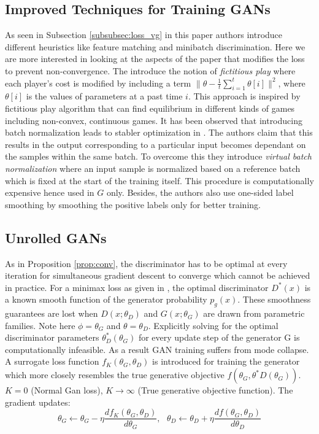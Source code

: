\subsection*{Improved Techniques for Training GANs \citep{goodfellow16}}
As seen in Subsection \ref{subsubsec:loss_vg} in this paper authors introduce different heuristics like feature matching and minibatch discrimination. Here we are more interested in looking at the aspects of the paper that modifies the loss to prevent non-convergence. 
The introduce the notion of \emph{fictitious play} where each player's cost is modified by including a term $\parallel \theta - \frac{1}{t} \sum_{i=1}^{t} \theta[i] \parallel^2$, where $\theta[i]$ is the values of parameters at a past time $i$. This approach is inspired by fictitious play algorithm that can find equilibrium in different kinds of games including non-convex, continuous games. It has been observed that introducing batch normalization leads to stabler optimization in \citep{dcgan}. The authors claim that this results in the output corresponding to a particular input becomes dependant on the samples within the same batch. To overcome this they introduce \emph{virtual batch normalization} where an input sample is normalized based on a reference batch which is fixed at the start of the training itself. This procedure is computationally expensive hence used in $G$ only. Besides, the authors also use one-sided label smoothing by smoothing the positive labels only for better training.


\subsection*{Unrolled GANs \citep{unrolled}}
As in Proposition \ref{prop:conv}, the discriminator has to be optimal at every iteration for simultaneous gradient descent to converge which cannot be achieved in practice.
For a minimax loss as given in \citep{ganGoodfellow}, the optimal discriminator $D^*(x)$ is a known smooth function of the generator probability $p_{g}(x).$ These smoothness guarantees are lost when $D(x;\theta_{D})$ and $G(x;\theta_{G})$ are drawn from parametric families. Note here $\phi = \theta_G$ and $\theta = \theta_D$. Explicitly solving for the optimal discriminator parameters $\theta^*_{D}(\theta_{G})$ for every update step of the generator G is computationally infeasible. As a result GAN training suffers from mode collapse. A surrogate loss function $f_{K}(\theta_{G}, \theta_{D})$ is introduced for training the generator which more closely resembles the true generative objective $f(\theta_{G}, \theta^*{D}(\theta_{G}))$. $K=0$ (Normal Gan loss), $K \rightarrow \infty$ (True generative objective function). 
The gradient updates: $$\theta_{G} \leftarrow \theta_{G} - \eta \frac{df_{K}(\theta_{G}, \theta_{D})}{d \theta_{G}}, \mbox{ }\theta_{D} \leftarrow \theta_{D} + \eta \frac{df(\theta_{G}, \theta_{D})}{d \theta_{D}} $$

